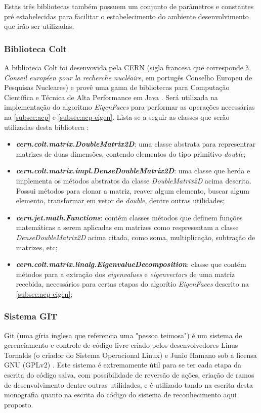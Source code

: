 Estas três bibliotecas também possuem um conjunto de parâmetros e constantes pré estabelecidas para facilitar o estabelecimento do ambiente desenvolvimento que irão ser utilizadas.

\subsubsection{Biblioteca Colt}\label{subsec:bib_colt}
A biblioteca Colt foi desenvovida pela CERN (sigla francesa que corresponde à \textit{Conseil européen pour la recherche nucléaire}, em portugês Conselho Europeu de Pesquisas Nucleares) e provê uma gama de bibliotecas para Computação Científica e Técnica de Alta Performance em Java \cite{colt}. Será utilizada na implementação do algoritmo \textit{EigenFaces} para performar as operações necessárias na \autoref{subsec:acp} e \autoref{subsec:acp-eigen}. Lista-se a seguir as classes que serão utilizadas desta biblioteca \cite{colt}:


\begin{itemize}
	\item \textbf{\textit{cern.colt.matrix.DoubleMatrix2D}}: uma classe abstrata para representrar matrizes de duas dimensões, contendo elementos do tipo primitivo \textit{double};
	
	\item \textbf{\textit{cern.colt.matrix.impl.DenseDoubleMatrix2D}}: uma classe que herda e implementa os métodos abstratos da classe \textit{DoubleMatrix2D} acima descrita. Possui métodos para clonar a matriz, reaver algum elemento, buscar algum elemento, transformar em vetor de \textit{double}, dentre outras utilidades;
			
	\item \textbf{\textit{cern.jet.math.Functions}}:  contém classes métodos que definem funções matemáticas a serem aplicadas em matrizes como respresentam a classe \textit{DenseDoubleMatrix2D} acima citada, como soma, multiplicação, subtração de matrizes, etc;
	
	\item \textbf{\textit{cern.colt.matrix.linalg.EigenvalueDecomposition}}: classe que contém métodos para a extração dos \textit{eigenvalues} e \textit{eigenvectors} de uma matriz recebida, necessários para certas etapas do algorítio \textit{EigenFaces} descrito na \autoref{subsec:acp-eigen};
\end{itemize}		


\subsubsection{Sistema GIT}\label{subsec:git}
Git (uma gíria inglesa que referencia uma "pessoa teimosa") é um sistema de gerenciamento e controle de código livre criado pelos desenvolvedores Linus Tornalds (o criador do Sistema Operacional Linux) e Junio Hamano sob a licensa GNU (GPLv2) \cite{git}. Este sistema é extremamente útil para se ter cada etapa da escrita do código salva, com possibilidade de reversão de ações, criação de ramos de desenvolvimento dentre outras utilidades, e é utilizado tando na escrita desta monografia quanto na escrita do código do sistema de reconhecimento aqui proposto.


